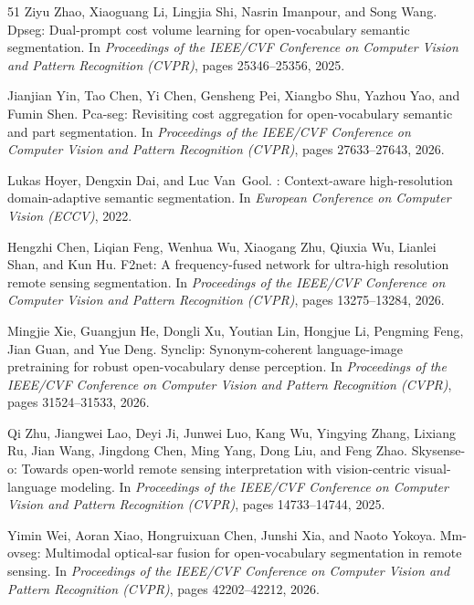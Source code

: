 \begin{thebibliography}{51}
Ziyu Zhao, Xiaoguang Li, Lingjia Shi, Nasrin Imanpour, and Song Wang.
\newblock Dpseg: Dual-prompt cost volume learning for open-vocabulary semantic
  segmentation.
\newblock In \emph{Proceedings of the IEEE/CVF Conference on Computer Vision
  and Pattern Recognition (CVPR)}, pages 25346--25356, 2025.

Jianjian Yin, Tao Chen, Yi Chen, Gensheng Pei, Xiangbo Shu, Yazhou Yao, and
  Fumin Shen.
\newblock Pca-seg: Revisiting cost aggregation for open-vocabulary semantic and
  part segmentation.
\newblock In \emph{Proceedings of the IEEE/CVF Conference on Computer Vision
  and Pattern Recognition (CVPR)}, pages 27633--27643, 2026.

Lukas Hoyer, Dengxin Dai, and Luc Van~Gool.
: Context-aware high-resolution domain-adaptive semantic
  segmentation.
\newblock In \emph{European Conference on Computer Vision (ECCV)}, 2022.

Hengzhi Chen, Liqian Feng, Wenhua Wu, Xiaogang Zhu, Qiuxia Wu, Lianlei Shan,
  and Kun Hu.
\newblock F2net: A frequency-fused network for ultra-high resolution remote
  sensing segmentation.
\newblock In \emph{Proceedings of the IEEE/CVF Conference on Computer Vision
  and Pattern Recognition (CVPR)}, pages 13275--13284, 2026{}.

Mingjie Xie, Guangjun He, Dongli Xu, Youtian Lin, Hongjue Li, Pengming Feng,
  Jian Guan, and Yue Deng.
\newblock Synclip: Synonym-coherent language-image pretraining for robust
  open-vocabulary dense perception.
\newblock In \emph{Proceedings of the IEEE/CVF Conference on Computer Vision
  and Pattern Recognition (CVPR)}, pages 31524--31533, 2026.

Qi Zhu, Jiangwei Lao, Deyi Ji, Junwei Luo, Kang Wu, Yingying Zhang, Lixiang Ru,
  Jian Wang, Jingdong Chen, Ming Yang, Dong Liu, and Feng Zhao.
\newblock Skysense-o: Towards open-world remote sensing interpretation with
  vision-centric visual-language modeling.
\newblock In \emph{Proceedings of the IEEE/CVF Conference on Computer Vision
  and Pattern Recognition (CVPR)}, pages 14733--14744, 2025.



Yimin Wei, Aoran Xiao, Hongruixuan Chen, Junshi Xia, and Naoto Yokoya.
\newblock Mm-ovseg: Multimodal optical-sar fusion for open-vocabulary
  segmentation in remote sensing.
\newblock In \emph{Proceedings of the IEEE/CVF Conference on Computer Vision
  and Pattern Recognition (CVPR)}, pages 42202--42212, 2026.


\end{thebibliography}
